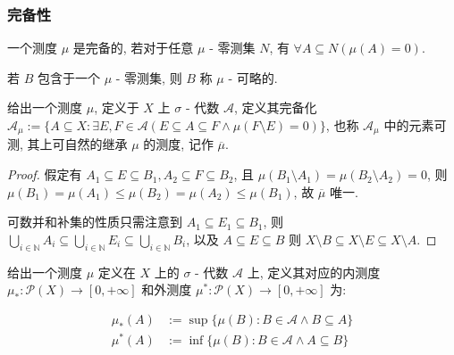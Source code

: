 \subsubsection{完备性}

\begin{definition}[完备性]
    一个测度 \(\mu\) 是完备的, 若对于任意 \(\mu\) - 零测集 \(N\), 有 \(\forall A \subseteq N (\mu(A) = 0)\).
\end{definition}

\begin{remark}
    若 \(B\) 包含于一个 \(\mu\) - 零测集, 则 \(B\) 称 \(\mu\) - 可略的.
\end{remark}

\begin{definition}[完备化]
    \label {definition:the completion of a measure}
    给出一个测度 \(\mu\), 定义于 \(X\) 上 \(\sigma\) - 代数 \(\mathcal{A}\), 定义其完备化 \(\mathcal{A}_\mu := \{A \subseteq X : \exists E,F \in \mathcal{A} (E \subseteq A \subseteq F \land \mu(F \setminus E) = 0)\}\),
    也称 \(\mathcal{A}_\mu\) 中的元素可测, 其上可自然的继承 \(\mu\) 的测度, 记作 \(\overline{\mu}\).

    \begin{proof}
        假定有 \(A_1 \subseteq E \subseteq B_1,A_2 \subseteq F \subseteq B_2\), 且 \(\mu(B_1 \setminus A_1) = \mu(B_2 \setminus A_2) = 0\),
        则 \(\mu(B_1) = \mu(A_1) \leq \mu(B_2) = \mu(A_2) \leq \mu(B_1)\), 故 \(\overline{\mu}\) 唯一.

        可数并和补集的性质只需注意到 \(A_1 \subseteq E_1 \subseteq B_1\), 则 \(\bigcup_{i \in \mathbb{N}} A_i \subseteq \bigcup_{i \in \mathbb{N}} E_i \subseteq \bigcup_{i \in \mathbb{N}} B_i\),
        以及 \(A \subseteq E \subseteq B\) 则 \(X \setminus B \subseteq X \setminus E \subseteq X \setminus A\).
    \end{proof}
\end{definition}

\begin{definition}
    给出一个测度 \(\mu\) 定义在 \(X\) 上的 \(\sigma\) - 代数 \(\mathcal{A}\) 上, 定义其对应的内测度 \(\mu_\ast : \mathcal{P} (X) \to [0, +\infty]\) 和外测度 \(\mu^\ast : \mathcal{P} (X) \to [0, +\infty]\) 为:

    \[
        \begin{aligned}
            \mu_\ast (A) &:= \sup \{\mu(B) : B \in \mathcal{A} \land B \subseteq A\} \\
            \mu^\ast (A) &:= \inf \{\mu(B) : B \in \mathcal{A} \land A \subseteq B\}
        \end{aligned}
    \]
\end{definition}

